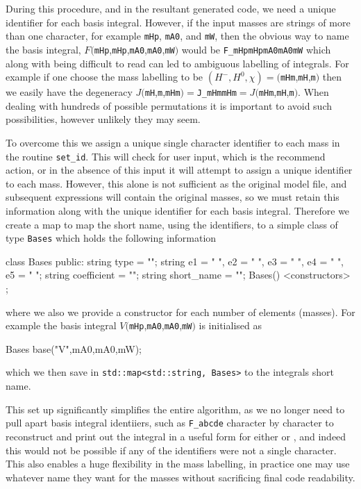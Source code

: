 During this procedure, and in the resultant generated \CC code, we need a unique identifier for each basis integral.  However, if the input masses are strings of more than one character, for example \lstinline{mHp}, \lstinline{mA0}, and \lstinline{mW}, then the obvious way to name the basis integral, $F($\lstinline{mHp},\lstinline{mHp},\lstinline{mA0},\lstinline{mA0},\lstinline{mW}$)$ would be \lstinline{F_mHpmHpmA0mA0mW} which along with being difficult to read can led to ambiguous labelling of integrals.  For example if one choose the mass labelling to be $(H^-, H^0, \chi ) = ($\lstinline{mHm},\lstinline{mH},\lstinline{m}$)$ then we easily have the degeneracy $J($\lstinline{mH},\lstinline{m},\lstinline{mHm}$) =  $\lstinline{J_mHmmHm}$ = J($\lstinline{mHm},\lstinline{mH},\lstinline{m}$)$.  When dealing with hundreds of possible permutations it is important to avoid such possibilities, however unlikely they may seem.

To overcome this we assign a unique single character identifier to each mass in the routine \lstinline{set_id}.  This will check for user input, which is the recommend action, or in the absence of this input it will attempt to assign a unique identifier to each mass.  However, this alone is not sufficient as the original \feynarts model file, and subsequent expressions will contain the original masses, so we must retain this information along with the unique identifier for each basis integral.  Therefore we create a \CC map to map the short name, using the identifiers, to a simple class of type \lstinline{Bases} which holds the following information
\begin{lstcpp}
class Bases
{
public:
	string type = "";
	string e1 = " ", e2 = " ", e3 = " ", e4 = " ", e5 = " ";
	string coefficient = "";
	string short_name = "";
	Bases() {}
	<constructors>
};
\end{lstcpp}
where we also we provide a constructor for each number of elements (masses).  For example the basis integral $V($\lstinline{mHp},\lstinline{mA0},\lstinline{mA0},\lstinline{mW}$)$ is initialised as\begin{lstcpp}
Bases base("V",mA0,mA0,mW);
\end{lstcpp}
which we then save in \lstinline{std::map<std::string, Bases>} to the integrals short name.

This set up significantly simplifies the entire algorithm, as we no longer need to pull apart basis integral identiiers, such as \lstinline{F_abcde} character by character to reconstruct and print out the integral in a useful form for either \feyncalc or \tsils, and indeed this would not be possible if any of the identifiers were not a single character.  This also enables a huge flexibility in the mass labelling, in practice one may use whatever name they want for the masses without sacrificing final code readability.



